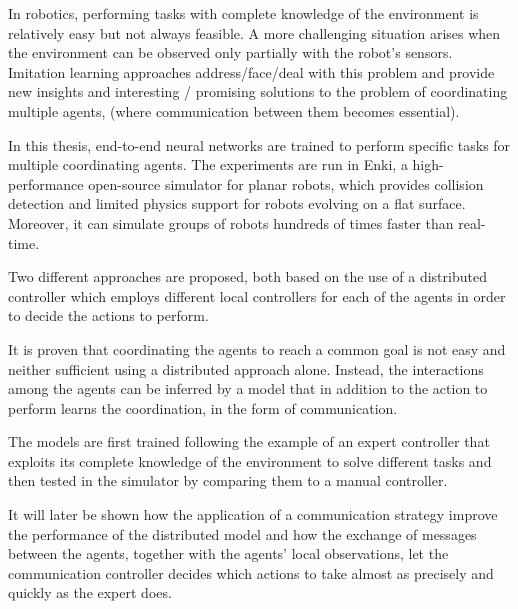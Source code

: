 In robotics, performing tasks with complete knowledge of the environment is 
relatively easy but not always feasible. A more challenging situation arises 
when the environment can be observed only partially with the robot's sensors. 
Imitation learning approaches address/face/deal with this problem and provide 
new insights and interesting / promising solutions to the problem of coordinating 
multiple agents, (where communication between them becomes essential).

In this thesis, end-to-end neural networks are trained to perform specific tasks for 
multiple coordinating agents. The experiments are run in Enki, a 
high-performance open-source simulator for planar robots, which provides 
collision detection and limited physics support for robots evolving on a flat 
surface. Moreover, it can simulate groups of robots hundreds of times faster than 
real-time.

Two different approaches are proposed, both based on the use of a distributed 
controller which employs different local controllers for each of the agents in order 
to decide the actions to perform. 

It is proven that coordinating the agents to reach a common goal is not easy and 
neither sufficient using a distributed approach alone. Instead, the interactions 
among the agents can be inferred by a model that in addition to the action to 
perform learns the coordination, in the form of communication. 

The models are first trained following the example of an expert controller that 
exploits its complete knowledge of the environment to solve different tasks and 
then tested in the simulator by comparing them to a manual controller.

It will later be shown how the application of a communication strategy improve 
the performance of the distributed model and how the exchange of messages 
between the agents, together with the agents' local observations, let the 
communication controller decides which actions to take almost as precisely and 
quickly as the expert does.
 